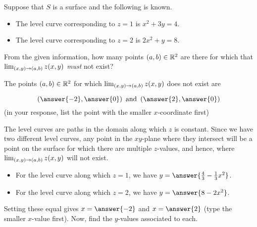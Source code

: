 \documentclass{ximera}
\author{Jim Talamo}
\begin{document}
\begin{exercise}
Suppose that $S$ is a surface and the following is known.

\begin{itemize}
\item The level curve corresponding to $z=1$ is $x^2+3y=4$.
\item The level curve corresponding to $z=2$ is $2x^2+y=8$.
\end{itemize}

From the given information, how many points $(a,b) \in \mathbb R^2$ are there for which that $\lim_{\left(x,y\right) \to \left(a,b\right)} z(x,y)$ \emph{must} not exist?

\begin{multipleChoice}
\end{multipleChoice}

\begin{exercise}
The points $(a,b) \in \mathbb R^2$ for which $\lim_{\left(x,y\right) \to \left(a,b\right)} z(x,y)$ does not exist are 

\[
\left(\answer{-2},\answer{0}\right) \textrm{ and } \left(\answer{2},\answer{0}\right)
\]
(in your response, list the point with the smaller $x$-coordinate first)



\begin{hint}
The level curves are paths in the domain along which $z$ is constant.  Since we have two different level curves, any point in the $xy$-plane where they intersect will be a point on the surface for which there are multiple $z$-values, and hence, where $\lim_{\left(x,y\right) \to \left(a,b\right)} z(x,y)$ will not exist.

\begin{itemize}
\item For the level curve along which $z=1$, we have $y = \answer{\frac{4}{3}-\frac{1}{3}x^2}$.
\item For the level curve along which $z=2$, we have $y = \answer{8-2x^2}$.
\end{itemize}

Setting these equal gives $x=\answer{-2}$ and $x=\answer{2}$ (type the smaller $x$-value first).  Now, find the $y$-values associated to each.
\end{hint}

\end{exercise}

\end{exercise}
\end{document}
